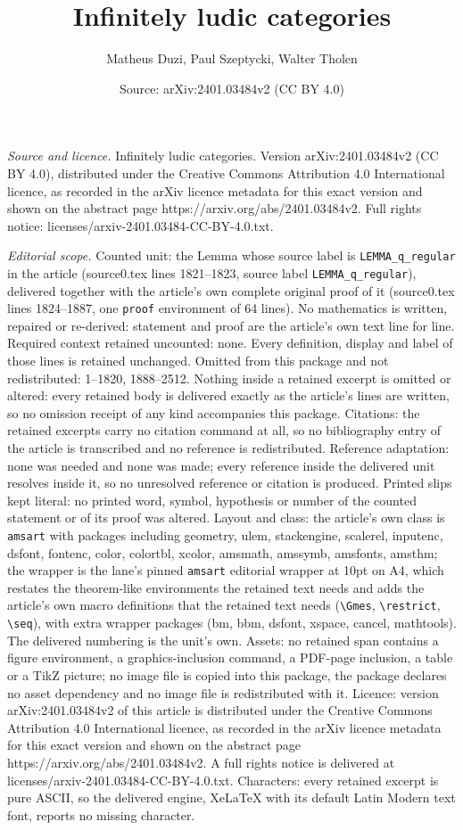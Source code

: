 \documentclass[10pt,a4paper]{amsart}
\title[Infinitely ludic categories]{Infinitely ludic categories}
\author{Matheus Duzi, Paul Szeptycki, Walter Tholen}
\date{Source: arXiv:2401.03484v2 (CC BY 4.0)}
\begin{document}
\maketitle

\noindent\emph{Source and licence.} Infinitely ludic categories. Version arXiv:2401.03484v2 (CC BY 4.0), distributed under the Creative Commons Attribution 4.0 International licence, as recorded in the arXiv licence metadata for this exact version and shown on the abstract page https://arxiv.org/abs/2401.03484v2. Full rights notice: licenses/arxiv-2401.03484-CC-BY-4.0.txt.\par\smallskip

\noindent\textit{Editorial scope.} Counted unit: the Lemma whose source label is \texttt{LEMMA\_q\_regular} in the article (source0.tex lines 1821--1823, source label \texttt{LEMMA\_q\_regular}), delivered together with the article's own complete original proof of it (source0.tex lines 1824--1887, one \texttt{proof} environment of 64 lines). No mathematics is written, repaired or re-derived: statement and proof are the article's own text line for line. Required context retained uncounted: none. Every definition, display and label of those lines is retained unchanged. Omitted from this package and not redistributed: 1--1820, 1888--2512. Nothing inside a retained excerpt is omitted or altered: every retained body is delivered exactly as the article's lines are written, so no omission receipt of any kind accompanies this package. Citations: the retained excerpts carry no citation command at all, so no bibliography entry of the article is transcribed and no reference is redistributed. Reference adaptation: none was needed and none was made; every reference inside the delivered unit resolves inside it, so no unresolved reference or citation is produced. Printed slips kept literal: no printed word, symbol, hypothesis or number of the counted statement or of its proof was altered. Layout and class: the article's own class is \texttt{amsart} with packages including geometry, ulem, stackengine, scalerel, inputenc, dsfont, fontenc, color, colortbl, xcolor, amsmath, amssymb, amsfonts, amsthm; the wrapper is the lane's pinned \texttt{amsart} editorial wrapper at 10pt on A4, which restates the theorem-like environments the retained text needs and adds the article's own macro definitions that the retained text needs (\texttt{\textbackslash Gmes}, \texttt{\textbackslash restrict}, \texttt{\textbackslash seq}), with extra wrapper packages (bm, bbm, dsfont, xspace, cancel, mathtools). The delivered numbering is the unit's own. Assets: no retained span contains a figure environment, a graphics-inclusion command, a PDF-page inclusion, a table or a TikZ picture; no image file is copied into this package, the package declares no asset dependency and no image file is redistributed with it. Licence: version arXiv:2401.03484v2 of this article is distributed under the Creative Commons Attribution 4.0 International licence, as recorded in the arXiv licence metadata for this exact version and shown on the abstract page https://arxiv.org/abs/2401.03484v2. A full rights notice is delivered at licenses/arxiv-2401.03484-CC-BY-4.0.txt. Characters: every retained excerpt is pure ASCII, so the delivered engine, XeLaTeX with its default Latin Modern text font, reports no missing character.
\end{document}
